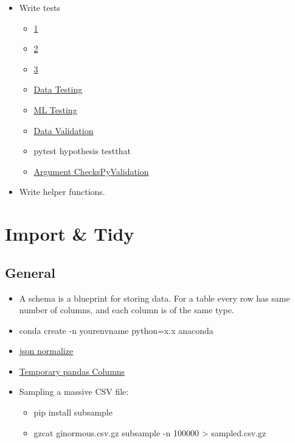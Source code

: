 \documentclass[]{book}
\providecommand{\tightlist}{%
  \setlength{\itemsep}{0pt}\setlength{\parskip}{0pt}}
\theoremstyle{definition}
\theoremstyle{definition}
\theoremstyle{definition}
\theoremstyle{remark}
\begin{document}
\begin{itemize}
\item
  Write tests

  \begin{itemize}
  \tightlist
  \item
    \href{http://engineering.pivotal.io/post/test-driven-development-for-data-science/}{1}
  \item
    \href{http://www.tdda.info/}{2}
  \item
    \href{http://stochasticsolutions.com/}{3}
  \item
    \href{https://github.com/ericmjl/data-testing-tutorial}{Data
    Testing}
  \item
    \href{https://medium.com/@keeper6928/how-to-unit-test-machine-learning-code-57cf6fd81765}{ML
    Testing}
  \item
    \href{https://github.com/data-cleaning/validate}{Data Validation}
  \item
    pytest \textbar{} hypothesis \textbar{} testthat
  \item
    \href{https://rdrr.io/cran/checkmate/}{Argument
    Checks}\href{https://github.com/shawnbrown/datatest}{PyValidation}
  \end{itemize}
\item
  Write helper functions.
\end{itemize}

\chapter{Import \& Tidy}\label{import-tidy}

\section{General}\label{general}

\begin{itemize}
\item
  A schema is a blueprint for storing data. For a table every row has
  same number of columns, and each column is of the same type.
\item
  conda create -n yourenvname python=x.x anaconda
\item
  \href{http://pandas.pydata.org/pandas-docs/stable/generated/pandas.io.json.json_normalize.html}{json
  normalize}
\item
  \href{https://github.com/jreback/PyDataNYC2015/blob/master/whats-new-in-pandas/v0.16.x.ipynb}{Temporary
  pandas Columns}
\item
  Sampling a massive CSV file:

  \begin{itemize}
  \item
    pip install subsample
  \item
    gzcat ginormous.csv.gz \textbar{} subsample -n 100000 \textgreater{}
    sampled.csv.gz
  \end{itemize}
\end{itemize}
\end{document}
